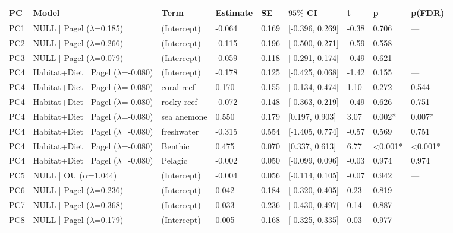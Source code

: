 \begin{table}[!h]
\centering
\caption{}
\centering
\begin{tabular}[t]{lllllllll}
\toprule
PC & Model & Term & Estimate & SE & $95\%$ CI & t & p & p(FDR)\\
\midrule
PC1 & NULL | Pagel ($\lambda$=0.185) & (Intercept) & -0.064 & 0.169 & {}[-0.396, 0.269] & -0.38 & 0.706 & ---\\
PC2 & NULL | Pagel ($\lambda$=0.266) & (Intercept) & -0.115 & 0.196 & {}[-0.500, 0.271] & -0.59 & 0.558 & ---\\
PC3 & NULL | Pagel ($\lambda$=0.079) & (Intercept) & -0.059 & 0.118 & {}[-0.291, 0.174] & -0.49 & 0.621 & ---\\
PC4 & Habitat+Diet | Pagel ($\lambda$=-0.080) & (Intercept) & -0.178 & 0.125 & {}[-0.425, 0.068] & -1.42 & 0.155 & ---\\
PC4 & Habitat+Diet | Pagel ($\lambda$=-0.080) & coral-reef & 0.170 & 0.155 & {}[-0.134, 0.474] & 1.10 & 0.272 & 0.544\\
\addlinespace
PC4 & Habitat+Diet | Pagel ($\lambda$=-0.080) & rocky-reef & -0.072 & 0.148 & {}[-0.363, 0.219] & -0.49 & 0.626 & 0.751\\
PC4 & Habitat+Diet | Pagel ($\lambda$=-0.080) & sea anemone & 0.550 & 0.179 & {}[0.197, 0.903] & 3.07 & 0.002* & 0.007*\\
PC4 & Habitat+Diet | Pagel ($\lambda$=-0.080) & freshwater & -0.315 & 0.554 & {}[-1.405, 0.774] & -0.57 & 0.569 & 0.751\\
PC4 & Habitat+Diet | Pagel ($\lambda$=-0.080) & Benthic & 0.475 & 0.070 & {}[0.337, 0.613] & 6.77 & \textless{}0.001* & \textless{}0.001*\\
PC4 & Habitat+Diet | Pagel ($\lambda$=-0.080) & Pelagic & -0.002 & 0.050 & {}[-0.099, 0.096] & -0.03 & 0.974 & 0.974\\
\addlinespace
PC5 & NULL | OU ($\alpha$=1.044) & (Intercept) & -0.004 & 0.056 & {}[-0.114, 0.105] & -0.07 & 0.942 & ---\\
PC6 & NULL | Pagel ($\lambda$=0.236) & (Intercept) & 0.042 & 0.184 & {}[-0.320, 0.405] & 0.23 & 0.819 & ---\\
PC7 & NULL | Pagel ($\lambda$=0.368) & (Intercept) & 0.033 & 0.236 & {}[-0.430, 0.497] & 0.14 & 0.887 & ---\\
PC8 & NULL | Pagel ($\lambda$=0.179) & (Intercept) & 0.005 & 0.168 & {}[-0.325, 0.335] & 0.03 & 0.977 & ---\\
\bottomrule
\end{tabular}
\end{table}
